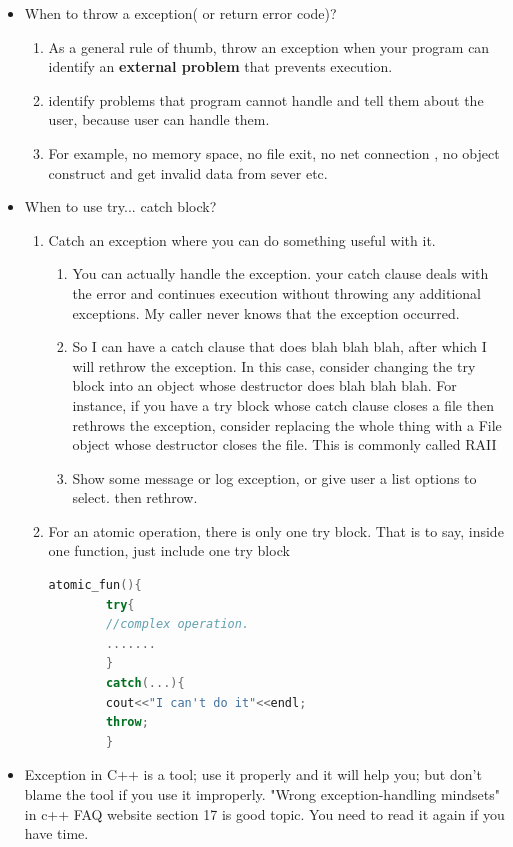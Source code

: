 \documentclass[a4paper,12pt,twoside]{book}
\begin{document}
\begin{itemize}
	
	\item When to throw a exception( or return error code)?
	\begin{enumerate}
		\item As a general rule of thumb, throw an exception when your program can identify an \textbf{external problem} that prevents execution.
		\item identify problems that program cannot handle and tell them about the user, because user can handle them.
		\item For example, no memory space, no file exit, no net connection , no object construct and get invalid data from sever etc.
	\end{enumerate}
	
	\item When to use try... catch block?
	\begin{enumerate}
		\item Catch an exception where you can do something useful with it.
		\begin{enumerate}
			\item You can actually handle the exception. your catch clause deals with the error and continues execution without throwing any additional exceptions. My caller never knows that the exception occurred.
			\item So I can have a catch clause that does blah blah blah, after which I will rethrow the exception. In this case, consider changing the try block into an object whose destructor does blah blah blah. For instance, if you have a try block whose catch clause closes a file then rethrows the exception, consider replacing the whole thing with a File object whose destructor closes the file. This is commonly called RAII
			\item Show some message or log exception, or give user a list options to select.  then rethrow.
		\end{enumerate}
		
		\item For an atomic operation, there is only one try block. That is to say, inside one function, just include one try block
		\begin{lstlisting}[frame=single, language=c++]
		atomic_fun(){
		try{
		//complex operation.
		.......
		}
		catch(...){
		cout<<"I can't do it"<<endl;
		throw;
		}
		\end{lstlisting}
	\end{enumerate}
	
	\item Exception in C++ is a tool; use it properly and it will help you; but don't blame the tool if you use it improperly. "Wrong exception-handling mindsets" in c++ FAQ website section 17 is good topic. You need to read it again if you have time.
	
\end{itemize}
\end{document}

